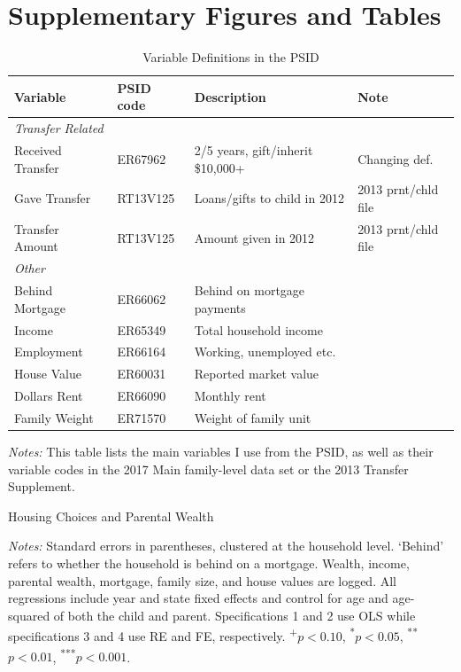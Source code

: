 \documentclass[12pt]{article}
\begin{document}
\section{Supplementary Figures and Tables}
\begin{table}
	\small	
	\caption{Variable Definitions in the PSID}\label{tab:vardef}
	\begin{threeparttable}
	\begin{tabular}{@{}llll@{}}
		\toprule
		Variable& PSID code & Description & Note \\ \midrule
		\textit{Transfer Related} \\ 
		Received Transfer & ER67962 & 2/5 years, gift/inherit \$10,000+ & Changing def. \\
		Gave Transfer & RT13V125 & Loans/gifts to child in 2012 & 2013 prnt/chld file \\ 
		Transfer Amount & RT13V125 & Amount given in 2012 & 2013 prnt/chld file \\
		\textit{Other} \\ 
		Behind Mortgage & ER66062 & Behind on mortgage payments\\
		Income & ER65349 & Total household income & \\
		Employment & ER66164 & Working, unemployed etc. \\
		House Value & ER60031 & Reported market value & \\
		Dollars Rent & ER66090 & Monthly rent\\
		Family Weight &	ER71570 & Weight of family unit & \\
		\bottomrule
	\end{tabular}
	{\textit{Notes:} This table lists the main variables I use from the PSID, as well as their variable codes in the 2017 Main family-level data set or the 2013 Transfer Supplement.}
	\end{threeparttable}
	
\end{table}

\begin{table}
	\centering
	\begin{threeparttable}
		\caption{Housing Choices and Parental Wealth}
		\label{tab:hypo_long}
		\small 
				
	
	\end{threeparttable}
	{\begin{footnotesize}\begin{flushleft}
		\textit{Notes:} Standard errors in parentheses, clustered at the household level. `Behind' refers to whether the household is behind on a mortgage. Wealth, income, parental wealth, mortgage, family size, and house values are logged. All regressions include year and state fixed effects and control for age and age-squared of both the child and parent. Specifications 1 and 2 use OLS while specifications 3 and 4 use RE and FE, respectively. \textsuperscript{+}$p<0.10$, \textsuperscript{*}$p<0.05$, \textsuperscript{**}$p<0.01$, \textsuperscript{***}$p<0.001$.
		\end{flushleft}\end{footnotesize}}	
\end{table}
\end{document}
